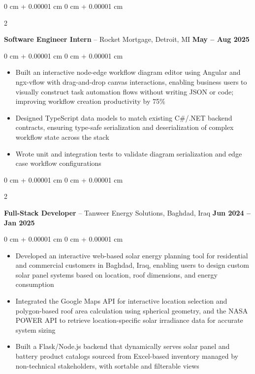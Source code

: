 \documentclass[10pt, letterpaper]{article}
\newenvironment{highlights}{
    \begin{itemize}[
        topsep=0.08 cm,
        parsep=0.08 cm,
        partopsep=0pt,
        itemsep=0pt,
        leftmargin=0 cm + 10pt
    ]
}{
    \end{itemize}
} %
\newenvironment{onecolentry}{
    \begin{adjustwidth}{
        0 cm + 0.00001 cm
    }{
        0 cm + 0.00001 cm
    }
}{
    \end{adjustwidth}
} %
\newenvironment{twocolentry}[2][]{
    \onecolentry
    \def\secondColumn{#2}
    \setcolumnwidth{\fill, 4.5 cm}
    \begin{paracol}{2}
}{
    \switchcolumn \raggedleft \secondColumn
    \end{paracol}
    \endonecolentry
} %
\begin{document}
        \vspace{0.25 cm}
        \begin{twocolentry}{
            \textbf{May -- Aug 2025}
        }
            \textbf{Software Engineer Intern} -- Rocket Mortgage, Detroit, MI\end{twocolentry}

        \vspace{0.08 cm}
        \begin{onecolentry}
            \begin{highlights}
                \item Built an interactive node-edge workflow diagram editor using Angular and ngx-vflow with drag-and-drop canvas interactions, enabling business users to visually construct task automation flows without writing JSON or code; improving workflow creation productivity by 75\%
                \item Designed TypeScript data models to match existing C\#/.NET backend contracts, ensuring type-safe serialization and deserialization of complex workflow state across the stack
                \item Wrote unit and integration tests to validate diagram serialization and edge case workflow configurations
            \end{highlights}
        \end{onecolentry}

        \vspace{0.25 cm}
        \begin{twocolentry}{
            \textbf{Jun 2024 -- Jan 2025}
        }
            \textbf{Full-Stack Developer} -- Tanweer Energy Solutions, Baghdad, Iraq\end{twocolentry}

        \vspace{0.08 cm}
        \begin{onecolentry}
            \begin{highlights}
                \item Developed an interactive web-based solar energy planning tool for
  residential and commercial customers in Baghdad, Iraq, enabling users to
  design custom solar panel systems based on location, roof dimensions, and
  energy consumption
                \item Integrated the Google Maps API for interactive location selection and
  polygon-based roof area calculation using spherical geometry, and the NASA
  POWER API to retrieve location-specific solar irradiance data for accurate
  system sizing
              \item Built a Flask/Node.js backend that dynamically serves solar panel and battery product catalogs sourced from Excel-based inventory managed by non-technical stakeholders, with sortable and filterable views
            \end{highlights}
        \end{onecolentry}
\end{document}
